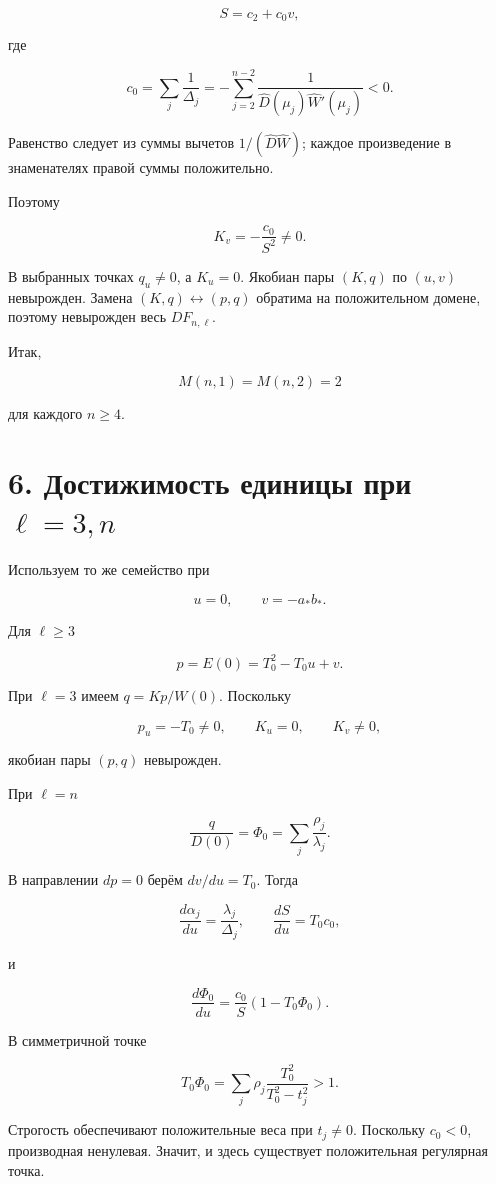 \documentclass[11pt,a4paper]{article}
\begin{document}
\[
S=c_2+c_0v,
\]

где

\[
c_0=\sum_j\frac1{\Delta_j}
=
-\sum_{j=2}^{n-2}
\frac1{\widehat D(\mu_j)\widehat W'(\mu_j)}
<0.
\]

Равенство следует из суммы вычетов \(1/(\widehat D\widehat W)\); каждое произведение в знаменателях правой суммы положительно.

Поэтому

\[
K_v=-\frac{c_0}{S^2}\ne0.
\]

В выбранных точках \(q_u\ne0\), а \(K_u=0\). Якобиан пары \((K,q)\) по \((u,v)\) невырожден. Замена \((K,q)\leftrightarrow(p,q)\) обратима на положительном домене, поэтому невырожден весь \(DF_{n,\ell}\).

Итак,

\[
M(n,1)=M(n,2)=2
\]

для каждого \(n\ge4\).

\section*{\color{ink} 6. Достижимость единицы при \(\ell=3,n\)}

Используем то же семейство при

\[
u=0,\qquad v=-a_*b_*.
\]

Для \(\ell\ge3\)

\[
p=E(0)=T_0^2-T_0u+v.
\]

При \(\ell=3\) имеем \(q=Kp/W(0)\). Поскольку

\[
p_u=-T_0\ne0,\qquad K_u=0,\qquad K_v\ne0,
\]

якобиан пары \((p,q)\) невырожден.

При \(\ell=n\)

\[
\frac q{D(0)}=\Phi_0=\sum_j\frac{\rho_j}{\lambda_j}.
\]

В направлении \(dp=0\) берём \(dv/du=T_0\). Тогда

\[
\frac{d\alpha_j}{du}=\frac{\lambda_j}{\Delta_j},
\qquad
\frac{dS}{du}=T_0c_0,
\]

и

\[
\frac{d\Phi_0}{du}
=
\frac{c_0}{S}(1-T_0\Phi_0).
\]

В симметричной точке

\[
T_0\Phi_0
=
\sum_j\rho_j
\frac{T_0^2}{T_0^2-t_j^2}>1.
\]

Строгость обеспечивают положительные веса при \(t_j\ne0\). Поскольку \(c_0<0\), производная ненулевая. Значит, и здесь существует положительная регулярная точка.
\end{document}
